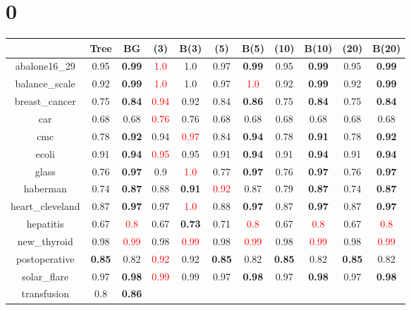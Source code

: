 \documentclass{article}%
\begin{document}
%
\normalsize%
\section*{0}%
\begin{tabular}{c|cccccccccc}%
\hline%
&Tree&BG&(3)&B(3)&(5)&B(5)&(10)&B(10)&(20)&B(20)\\%
\hline%
abalone16\_29&0.95&\textbf{0.99}&\textcolor{red}{ 
1.0
}&1.0&0.97&\textbf{0.99}&0.95&\textbf{0.99}&0.95&\textbf{0.99}\\%
\hline%
balance\_scale&0.92&\textbf{0.99}&\textcolor{red}{ 
1.0
}&1.0&0.97&\textcolor{red}{ 
1.0
}&0.92&\textbf{0.99}&0.92&\textbf{0.99}\\%
\hline%
breast\_cancer&0.75&\textbf{0.84}&\textcolor{red}{ 
0.94
}&0.92&0.84&\textbf{0.86}&0.75&\textbf{0.84}&0.75&\textbf{0.84}\\%
\hline%
car&0.68&0.68&\textcolor{red}{ 
0.76
}&0.76&0.68&0.68&0.68&0.68&0.68&0.68\\%
\hline%
cmc&0.78&\textbf{0.92}&0.94&\textcolor{red}{ 
0.97
}&0.84&\textbf{0.94}&0.78&\textbf{0.91}&0.78&\textbf{0.92}\\%
\hline%
ecoli&0.91&\textbf{0.94}&\textcolor{red}{ 
0.95
}&0.95&0.91&\textbf{0.94}&0.91&\textbf{0.94}&0.91&\textbf{0.94}\\%
\hline%
glass&0.76&\textbf{0.97}&0.9&\textcolor{red}{ 
1.0
}&0.77&\textbf{0.97}&0.76&\textbf{0.97}&0.76&\textbf{0.97}\\%
\hline%
haberman&0.74&\textbf{0.87}&0.88&\textbf{0.91}&\textcolor{red}{ 
0.92
}&0.87&0.79&\textbf{0.87}&0.74&\textbf{0.87}\\%
\hline%
heart\_cleveland&0.87&\textbf{0.97}&0.97&\textcolor{red}{ 
1.0
}&0.88&\textbf{0.97}&0.87&\textbf{0.97}&0.87&\textbf{0.97}\\%
\hline%
hepatitis&0.67&\textcolor{red}{ 
0.8
}&0.67&\textbf{0.73}&0.71&\textcolor{red}{ 
0.8
}&0.67&\textcolor{red}{ 
0.8
}&0.67&\textcolor{red}{ 
0.8
}\\%
\hline%
new\_thyroid&0.98&\textcolor{red}{ 
0.99
}&0.98&\textcolor{red}{ 
0.99
}&0.98&\textcolor{red}{ 
0.99
}&0.98&\textcolor{red}{ 
0.99
}&0.98&\textcolor{red}{ 
0.99
}\\%
\hline%
postoperative&\textbf{0.85}&0.82&\textcolor{red}{ 
0.92
}&0.92&\textbf{0.85}&0.82&\textbf{0.85}&0.82&\textbf{0.85}&0.82\\%
\hline%
solar\_flare&0.97&\textbf{0.98}&\textcolor{red}{ 
0.99
}&0.99&0.97&\textbf{0.98}&0.97&\textbf{0.98}&0.97&\textbf{0.98}\\%
\hline%
transfusion&0.8&\textbf{0.86}&\textcolor{red}{ 
}
\end{tabular}
\end{document}
